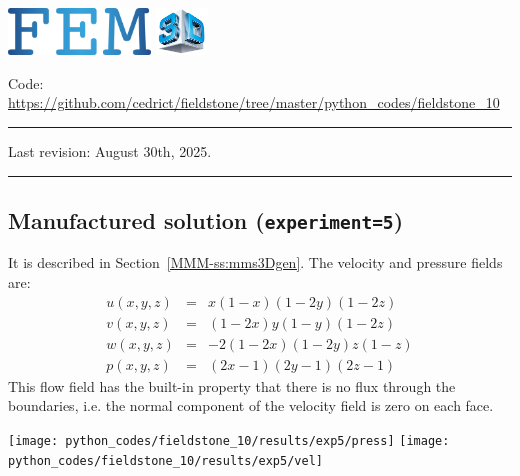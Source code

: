 \includegraphics[height=1.25cm]{images/pictograms/FEM}
\includegraphics[height=1.25cm]{images/pictograms/3d}




\begin{center}
\inpython
\injulia
\infortran
{\small Code: \url{https://github.com/cedrict/fieldstone/tree/master/python_codes/fieldstone_10}}
\end{center}

\par\noindent\rule{\textwidth}{0.4pt}

Last revision: August 30th, 2025.

\par\noindent\rule{\textwidth}{0.4pt}


\subsection*{Manufactured solution ({\tt experiment=5})}

It is described in Section~\ref{MMM-ss:mms3Dgen}.
The velocity and pressure fields are:
\begin{eqnarray}
u(x,y,z) &=& x(1-x)(1-2y)(1-2z)\\
v(x,y,z) &=& (1-2x) y(1-y) (1-2z) \\
w(x,y,z) &=& -2(1-2x)(1-2y)z(1-z) \\
p(x,y,z) &=& (2x-1)(2y-1)(2z-1)
\end{eqnarray}
This flow field has the built-in property that there is no flux through the 
boundaries, i.e. the normal component of the velocity field is zero on each face. 

\begin{center}
\texttt{[image: python\_codes/fieldstone\_10/results/exp5/press]}
\texttt{[image: python\_codes/fieldstone\_10/results/exp5/vel]}
\end{center}

